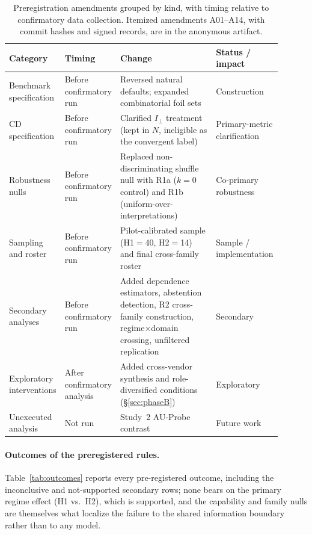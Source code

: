 \documentclass[acmsmall,screen,review,anonymous]{acmart}
\newcommand{\iperp}{\ensuremath{I_\perp}}
\begin{document}
\begin{table}[t]
\centering\small
\caption{Preregistration amendments grouped by kind, with timing relative to confirmatory data
collection. Itemized amendments A01--A14, with commit hashes and signed records, are in the
anonymous artifact.}
\label{tab:deviations}
\begin{tabular}{@{}p{0.18\linewidth}p{0.17\linewidth}p{0.40\linewidth}p{0.15\linewidth}@{}}
\toprule
Category & Timing & Change & Status / impact \\
\midrule
Benchmark specification & Before confirmatory run & Reversed natural defaults; expanded
combinatorial foil sets & Construction \\
CD specification & Before confirmatory run & Clarified \iperp{} treatment (kept in $N$,
ineligible as the convergent label) & Primary-metric clarification \\
Robustness nulls & Before confirmatory run & Replaced non-discriminating shuffle null with R1a
($k{=}0$ control) and R1b (uniform-over-interpretations) & Co-primary robustness \\
Sampling and roster & Before confirmatory run & Pilot-calibrated sample (H1$=$40, H2$=$14) and
final cross-family roster & Sample / implementation \\
Secondary analyses & Before confirmatory run & Added dependence estimators, abstention
detection, R2 cross-family construction, regime$\times$domain crossing, unfiltered replication &
Secondary \\
Exploratory interventions & After confirmatory analysis & Added cross-vendor synthesis and
role-diversified conditions (\S\ref{sec:phaseB}) & Exploratory \\
Unexecuted analysis & Not run & Study~2 AU-Probe contrast & Future work \\
\bottomrule
\end{tabular}
\end{table}

\paragraph{Outcomes of the preregistered rules.} Table~\ref{tab:outcomes} reports every pre-registered
outcome, including the inconclusive and not-supported secondary rows; none bears on the primary regime effect
(H1 vs.\ H2), which is supported, and the capability and family nulls are themselves what localize the failure
to the shared information boundary rather than to any model.
\end{document}
